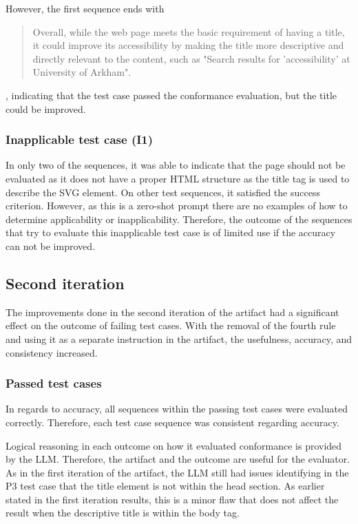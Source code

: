 However, the first sequence ends with \blockquote{Overall, while the web page meets the basic requirement of having a title, it could improve its accessibility by making the title more descriptive and directly relevant to the content, such as "Search results for 'accessibility' at University of Arkham".}, indicating that the test case passed the conformance evaluation, but the title could be improved.

\subsubsection{Inapplicable test case (I1)}

In only two of the sequences, it was able to indicate that the page should not be evaluated as it does not have a proper HTML structure as the title tag is used to describe the SVG element. On other test sequences, it satisfied the success criterion. However, as this is a zero-shot prompt there are no examples of how to determine applicability or inapplicability. Therefore, the outcome of the sequences that try to evaluate this inapplicable test case is of limited use if the accuracy can not be improved.

\subsection{Second iteration}

The improvements done in the second iteration of the artifact had a significant effect on the outcome of failing test cases. With the removal of the fourth rule and using it as a separate instruction in the artifact, the usefulness, accuracy, and consistency increased.

\subsubsection{Passed test cases}

In regards to accuracy, all sequences within the passing test cases were evaluated correctly. Therefore, each test case sequence was consistent regarding accuracy.

Logical reasoning in each outcome on how it evaluated conformance is provided by the LLM. Therefore, the artifact and the outcome are useful for the evaluator. As in the first iteration of the artifact, the LLM still had issues identifying in the P3 test case that the title element is not within the head section. As earlier stated in the first iteration results, this is a minor flaw that does not affect the result when the descriptive title is within the body tag.


